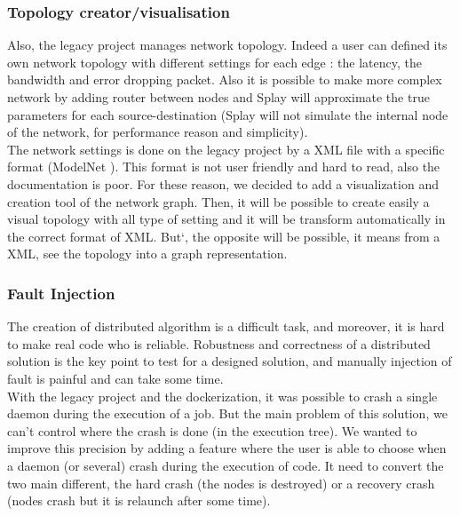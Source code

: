 \documentclass{eplmastersthesis}
\begin{document}
        \subsubsection{Topology creator/visualisation} %

        Also, the legacy project manages network topology. Indeed a user can
        defined its own network topology with different settings for each
        edge : the latency, the bandwidth and error dropping packet. Also it
        is possible to make more complex network by adding router between nodes
        and Splay will approximate the true parameters for each
        source-destination (Splay will not simulate the internal node of the
        network, for performance reason and simplicity). \\

        The network settings is done on the legacy project by a XML file with a
        specific format (ModelNet \cite{ModelNet}). This format is not user
        friendly and hard to read, also the documentation is poor. For these
        reason, we decided to add a visualization and creation tool of the
        network graph. Then, it will be possible to create easily a visual
        topology with all type of setting and it will be transform
        automatically in the correct format of XML. But`, the opposite will be
        possible, it means from a XML, see the topology into a graph
        representation.

        \subsubsection{Fault Injection} %

        The creation of distributed algorithm is a difficult task, and
        moreover, it is hard to make real code who is reliable. Robustness
        and correctness of a distributed solution is the key point to test
        for a designed solution, and manually injection of fault is painful
        and can take some time. \\

        With the legacy project and the dockerization, it was possible to
        crash a single daemon during the execution of a job. But the main
        problem of this solution, we can't control where the crash is done
        (in the execution tree). We wanted to improve this precision by adding
        a feature where the user is able to choose when a daemon (or several)
        crash during the execution of code. It need to convert the two main
        different, the hard crash (the nodes is destroyed) or a recovery crash
        (nodes crash but it is relaunch after some time). \\
\end{document}
